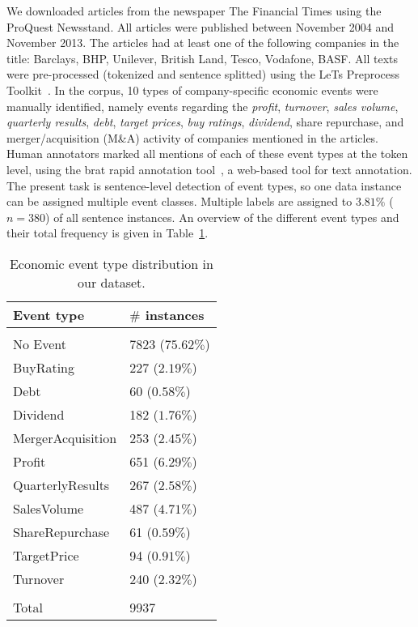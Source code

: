 \documentclass[11pt,a4paper]{article}
\begin{document}
We downloaded articles from the newspaper The Financial Times using the ProQuest Newsstand. All articles were published between November 2004 and November 2013.
The articles had at least one of the following companies in the title: Barclays, BHP, Unilever, British Land, Tesco, Vodafone, BASF. 
All texts were pre-processed (tokenized and sentence splitted) using the LeTs Preprocess Toolkit~\cite{VandeKauter2013}.
In the corpus, 10 types of company-specific economic events were manually identified, namely events regarding the \emph{profit}, \emph{turnover}, \emph{sales volume}, \emph{quarterly results}, \emph{debt}, \emph{target prices}, \emph{buy ratings}, \emph{dividend}, share repurchase, and merger/acquisition (M\&A) activity of companies mentioned in the articles.
Human annotators marked all mentions of each of these event types at the token level, using the brat rapid annotation tool~\cite{Stenetorp2012}, a web-based tool for text annotation.
The present task is sentence-level detection of event types, so one data instance can be assigned multiple event classes.
Multiple labels are assigned to $3.81\%$ ($n=380$) of all sentence instances.
An overview of the different event types and their total frequency is given in Table~\ref{tab:instances}.   

\begin{table}[h!]
	\centering
	\small{
		\begin{tabular}{ll}
			\textbf{Event type} & \textbf{$\#$ instances} \\   
			\hline                                        \\
			No Event            & 7823 ($75.62\%$)        \\
			BuyRating           & 227 ($2.19\%$)          \\
			Debt                & 60 ($0.58\%$)           \\
			Dividend            & 182 ($1.76\%$)          \\
			MergerAcquisition   & 253 ($2.45\%$)          \\
			Profit              & 651 ($6.29\%$)          \\
			QuarterlyResults    & 267 ($2.58\%$)          \\
			SalesVolume         & 487 ($4.71\%$)          \\
			ShareRepurchase     & 61 ($0.59\%$)           \\
			TargetPrice         & 94 ($0.91\%$)           \\
			Turnover            & 240 ($2.32\%$)          \\
			\hline                                        \\
			Total               & 9937                    \\
		\end{tabular}
		\caption{Economic event type distribution in our dataset.}
		\label{tab:instances}
	}
\end{table}
\end{document}
